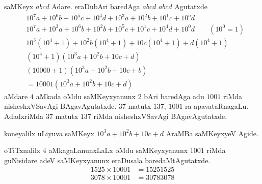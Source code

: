 saMKeyx $abcd$ Adare. eraDubAri baredAga $abcd$ $abcd$ Agutatxde
{\fontsize{10}{12}\selectfont
\begin{align*}
& 10^{7}a + 10^{6}b +10^{5}c +10^{4}d + 10^{3}a + 10^{2}b +10^{1}c +10^{o}d\\
& 10^{7}a +10^{3}a +10^{6}b +10^{2}b + 10^{5}c +10^{1}c + 10^{4}d +10^{0}d \qquad\text{$\left(10^0 =1\right)$}\\
& 10^3\left(10^4 +1\right) +10^{2}b\left(10^4 +1\right) + 10c\left(10^4 +1\right) +d \left(10^4+ 1\right)\\
&\left(10^4 +1\right) \left(10^{3}a + 10^{2}b +10c + d\right)\\
&(10000+1)\left(10^{3}a + 10^{2}b+10c+b\right)\\
&=10001\left(10^{3}a + 10^{2}b +10c +d\right)
 \end{align*}}
aMdare $4$ aMkada oMdu saMKeyxyanunx $2$ bAri baredAga adu $1001$ riMda nisheshxVSa\-vAgi BAgavAgutatxde. $37$ matutx $137$, $1001$ ra apavataRnagaLu. AdadxriMda $37$ matutx $137$ riMda nisheshxVSavAgi BAgavAgutatxde.

koneyalilx uLiyuva saMKeyx $10^{3}a+10^{2}b+10c+d$ AraMBa saMKeyxyeV Agide.

oTiTxnalilx $4$ aMkagaLanunxLaLx oMdu saMKeyxyanunx $1001$ riMda guNisidare adeV saMKeyx\-yanunx eraDusala baredaMtAgutatxde. 
\begin{align*}
1525\times 10001 &= 15251525\\
3078 \times 10001 &= 30783078
\end{align*}

